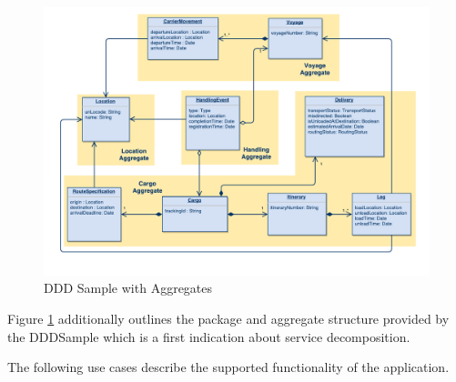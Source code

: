 \begin{figure}[H]
	\includegraphics[scale=0.5]{diagrams/ddd_sample_aggregates.pdf}
	\caption{DDD Sample with Aggregates}
	\label{fig:dddSampleAggregates}
\end{figure}

Figure \ref{fig:dddSampleAggregates} additionally outlines the package and aggregate structure provided by the DDDSample which is a first indication about service decomposition. 

The following use cases describe the supported functionality of the application.

